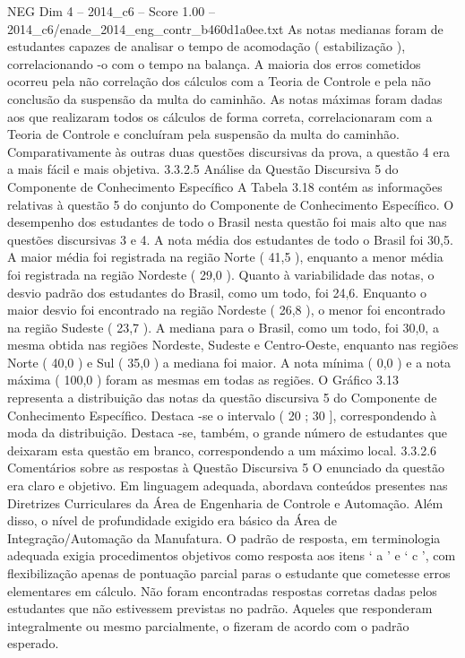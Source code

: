 \begin{textsample}{NEG Dim 4 – 2014\_c6 – Score 1.00 – 2014\_c6/enade\_2014\_eng\_contr\_b460d1a0ee.txt}
As notas medianas foram de estudantes capazes de analisar o tempo de acomodação ( estabilização ), correlacionando -o com o tempo na balança.
A maioria dos erros cometidos ocorreu pela não correlação dos cálculos com a Teoria de Controle e pela não conclusão da suspensão da multa do caminhão.
As notas máximas foram dadas aos que realizaram todos os cálculos de forma correta, correlacionaram com a Teoria de Controle e concluíram pela suspensão da multa do caminhão.
Comparativamente às outras duas questões discursivas da prova, a questão 4 era a mais fácil e mais objetiva. 3.3.2.5 Análise da Questão Discursiva 5 do Componente de Conhecimento Específico A Tabela 3.18 contém as informações relativas à questão 5 do conjunto do Componente de Conhecimento Específico.
O desempenho dos estudantes de todo o Brasil nesta questão foi mais alto que nas questões discursivas 3 e 4.
A nota média dos estudantes de todo o Brasil foi 30,5.
A maior média foi registrada na região Norte ( 41,5 ), enquanto a menor média foi registrada na região Nordeste ( 29,0 ).
Quanto à variabilidade das notas, o desvio padrão dos estudantes do Brasil, como um todo, foi 24,6.
Enquanto o maior desvio foi encontrado na região Nordeste ( 26,8 ), o menor foi encontrado na região Sudeste ( 23,7 ).
A mediana para o Brasil, como um todo, foi 30,0, a mesma obtida nas regiões Nordeste, Sudeste e Centro-Oeste, enquanto nas regiões Norte ( 40,0 ) e Sul ( 35,0 ) a mediana foi maior.
A nota mínima ( 0,0 ) e a nota máxima ( 100,0 ) foram as mesmas em todas as regiões.
O Gráfico 3.13 representa a distribuição das notas da questão discursiva 5 do Componente de Conhecimento Específico.
Destaca -se o intervalo ( 20 ; 30 ], correspondendo à moda da distribuição.
Destaca -se, também, o grande número de estudantes que deixaram esta questão em branco, correspondendo a um máximo local. 3.3.2.6 Comentários sobre as respostas à Questão Discursiva 5 O enunciado da questão era claro e objetivo.
Em linguagem adequada, abordava conteúdos presentes nas Diretrizes Curriculares da Área de Engenharia de Controle e Automação.
Além disso, o nível de profundidade exigido era básico da Área de Integração/Automação da Manufatura.
O padrão de resposta, em terminologia adequada exigia procedimentos objetivos como resposta aos itens ‘ a ’ e ‘ c ’, com flexibilização apenas de pontuação parcial paras o estudante que cometesse erros elementares em cálculo.
Não foram encontradas respostas corretas dadas pelos estudantes que não estivessem previstas no padrão.
Aqueles que responderam integralmente ou mesmo parcialmente, o fizeram de acordo com o padrão esperado.

\end{textsample}
